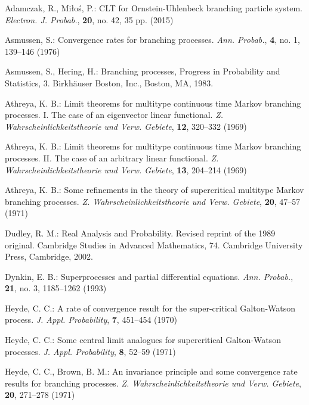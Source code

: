 \documentclass{amse-new}
\numberwithin{equation}{section}
\begin{document}
\begin{thebibliography}{99}

	Adamczak, R., Mi{\l}o\'{s}, P.:
	C{LT} for {O}rnstein-{U}hlenbeck branching particle system.
	\emph{Electron. J. Probab.}, \textbf{20}, no. 42, 35 pp. (2015)

	Asmussen, S.: 
	Convergence rates for branching processes.
	\emph{Ann. Probab.}, \textbf{4}, no. 1, 139--146 (1976)

	Asmussen, S., Hering, H.: 
	Branching processes,
	Progress in Probability and Statistics, 3. Birkh\"{a}user Boston, Inc., Boston, MA, 1983.

	Athreya, K. B.: 
	Limit theorems for multitype continuous time {M}arkov branching processes. {I}. {T}he case of an eigenvector linear functional.
	\emph{Z. Wahrscheinlichkeitstheorie und Verw. Gebiete}, \textbf{12}, 320--332 (1969)

  	Athreya, K. B.: 
  	Limit theorems for multitype continuous time {M}arkov branching processes. {II}. {T}he case of an arbitrary linear functional.
	\emph{Z. Wahrscheinlichkeitstheorie und Verw. Gebiete}, \textbf{13}, 204--214 (1969)

  	Athreya, K. B.: 
  	Some refinements in the theory of supercritical multitype {M}arkov branching processes.
	\emph{Z. Wahrscheinlichkeitstheorie und Verw. Gebiete}, \textbf{20}, 47--57 (1971)

  	Dudley, R. M.: 
	Real Analysis and Probability. 
	Revised reprint of the 1989 original. 
	Cambridge Studies in Advanced Mathematics, 74.
  	Cambridge University Press, Cambridge, 2002.

  	Dynkin, E. B.: 
  	Superprocesses and partial differential equations.
	\emph{Ann. Probab.}, \textbf{21}, no. 3, 1185--1262 (1993)

	Heyde, C. C.: 
 	A rate of convergence result for the super-critical {G}alton-{W}atson process.
	\emph{J. Appl. Probability}, \textbf{7}, 451--454 (1970)

  	Heyde, C. C.: 
   	Some central limit analogues for supercritical {G}alton-{W}atson processes.
	\emph{J. Appl. Probability}, \textbf{8}, 52--59 (1971)

  	Heyde, C. C., Brown, B. M.: 
  	An invariance principle and some convergence rate results for branching processes.
	\emph{Z. Wahrscheinlichkeitstheorie und Verw. Gebiete}, \textbf{20}, 271--278 (1971)


\end{thebibliography}
\end{document}
